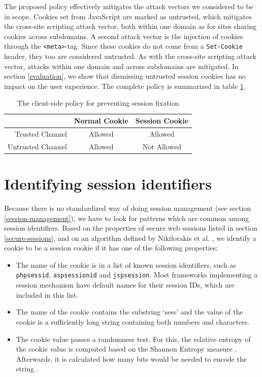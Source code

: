 The proposed policy effectively mitigates the attack vectors we considered to be in scope. Cookies set from JavaScript are marked as untrusted, which mitigates the cross-site scripting attack vector, both within one domain as for sites sharing cookies across subdomains. A second attack vector is the injection of cookies through the \texttt{<meta>}-tag. Since these cookies do not come from a \texttt{Set-Cookie} header, they too are considered untrusted. As with the cross-site scripting attack vector, attacks within one domain and across subdomains are mitigated. In section \ref{evaluation}, we show that dismissing untrusted session cookies has no impact on the user experience. The complete policy is summarized in table \ref{tab:nofix-policy}.

\begin{table}[ht]
	\centering
	\begin{tabular}{r|cc}
		& Normal Cookie & Session Cookie\\
		\hline
		Trusted Channel & Allowed & Allowed\\
		Untrusted Channel & Allowed & Not Allowed\\
	\end{tabular}
	\caption{The client-side policy for preventing session fixation}
	\label{tab:nofix-policy}
\end{table}

\section{Identifying session identifiers}\label{detecting-sids}

Because there is no standardized way of doing session management (see section \ref{session-management}), we have to look for patterns which are common among session identifiers. Based on the properties of secure web sessions listed in section \ref{secure-sessions}, and on an algorithm defined by Nikiforakis et al. \cite{Nikiforakis2010}, we identify a cookie to be a session cookie if it has one of the following properties:
\begin{itemize}
	\item The name of the cookie is in a list of known session identifiers, such as \texttt{phpsessid}, \texttt{aspsessionid} and \texttt{jspsession}. Most frameworks implementing a session mechanism have default names for their session IDs, which are included in this list.
	\item The name of the cookie contains the substring `sess' and the value of the cookie is a sufficiently long string containing both numbers and characters.
	\item The cookie value passes a randomness test. For this, the relative entropy of the cookie value is computed based on the Shannon Entropy measure \cite{Kaplan2002}. Afterwards, it is calculated how many bits would be needed to encode the string \cite{Nikiforakis2010}.
\end{itemize}

